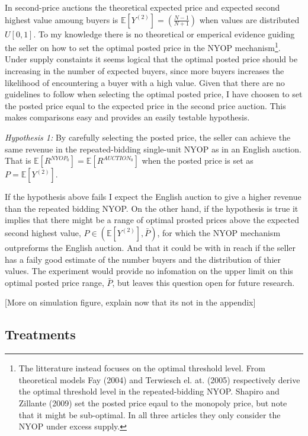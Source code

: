 \documentclass[a4paper,12pt]{article}
\begin{document}
	In second-price auctions the theoretical expected price and expected second highest value amoung buyers is $\mathbb{E}[Y^{(2)}] = (\frac{N-1}{N+1})$ when values are distributed $U[0,1]$. To my knowledge there is no theoretical or emperical evidence guiding the seller on how to set the optimal posted price in the NYOP mechanism\footnote{The litterature instead focuses on the optimal threshold level. From theoretical models Fay (2004) and Terwiesch el. at. (2005) respectively derive the optimal threshold level in the repeated-bidding NYOP. Shapiro and Zillante (2009) set the posted price eqaul to the monopoly price, but note that it might be sub-optimal. In all three articles they only consider the NYOP under excess supply.}. Under supply constaints it seems logical that the optimal posted price should be increasing in the number of expected buyers, since more buyers increases the likelihood of encountering a buyer with a high value. Given that there are no guidelines to follow when selecting the optimal posted price, I have choosen to set the posted price equal to the expected price in the second price auction. This makes comparisons easy and provides an easily testable hypothesis.

	\emph{Hypothesis 1:} By carefully selecting the posted price, the seller can achieve the same revenue in the repeated-bidding single-unit NYOP as in an English auction. That is $\mathbb{E}[R^{NYOP_0}] = \mathbb{E}[R^{AUCTION_0}]$ when the posted price is set as $P = \mathbb{E}[Y^{(2)}]$.
	
	If the hypothesis above fails I expect the English auction to give a higher revenue than the repeated bidding NYOP. On the other hand, if the hypothesis is true it implies that there might be a range of optimal prosted prices above the expected second highest value, $P \in (\mathbb{E}[Y^{(2)}], \bar{P})$, for which the NYOP mechanism outpreforms the English auction. And that it could be with in reach if the seller has a faily good estimate of the number buyers and the distribution of thier values. The experiment would provide no infomation on the upper limit on this optimal posted price range, $\bar{P}$, but leaves this question open for future research.
	
	[More on simulation figure, explain now that its not in the appendix]

	\subsection{Treatments}
	\label{sec:treatments}
\end{document}
